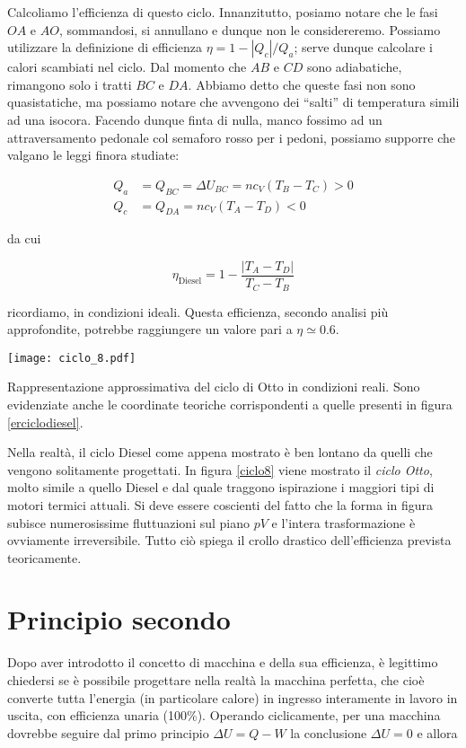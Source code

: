 Calcoliamo l'efficienza di questo ciclo. Innanzitutto, posiamo
notare che le fasi $OA$ e $AO$, sommandosi, si annullano e dunque
non le considereremo. Possiamo utilizzare la definizione di
efficienza $\eta = 1 - |Q_c|/Q_a$; serve dunque calcolare i
calori scambiati nel ciclo. Dal momento che $AB$ e $CD$ sono
adiabatiche, rimangono solo i tratti $BC$ e $DA$. Abbiamo detto
che queste fasi non sono quasistatiche, ma possiamo notare che
avvengono dei ``salti'' di temperatura simili ad una isocora.
Facendo dunque finta di nulla, manco fossimo ad un attraversamento
pedonale col semaforo rosso per i pedoni,
possiamo supporre che valgano le leggi finora studiate:

\begin{align*}
    Q_a &= Q_{BC} = \Delta U_{BC} = nc_V(T_B - T_C) > 0\\
    Q_c &= Q_{DA} = nc_V(T_A - T_D) < 0
\end{align*}

\noindent da cui

\[ \eta_\text{Diesel} = 1 - \frac{|T_A - T_D|}{T_C - T_B} \]

\noindent ricordiamo, in condizioni ideali. Questa efficienza,
secondo analisi più approfondite, potrebbe raggiungere un
valore pari a $\eta \simeq 0.6$.

\begin{marginfigure}
    \centering
    \texttt{[image: ciclo\_8.pdf]}
    \caption{Rappresentazione approssimativa del ciclo di Otto in
    condizioni reali. Sono evidenziate anche le coordinate teoriche
    corrispondenti a quelle presenti in figura \ref{erciclodiesel}.}
    \label{ciclo8}
\end{marginfigure}

Nella realtà, il ciclo Diesel come appena mostrato è ben lontano
da quelli che vengono solitamente progettati. In figura \ref{ciclo8}
viene mostrato il \textit{ciclo Otto}, molto simile a quello Diesel
e dal quale traggono ispirazione i maggiori tipi di motori termici
attuali. Si deve essere coscienti del fatto che la forma in figura
subisce numerosissime fluttuazioni sul piano $pV$ e l'intera trasformazione
è ovviamente irreversibile. Tutto ciò spiega il crollo drastico
dell'efficienza prevista teoricamente.






\section{Principio secondo}
Dopo aver introdotto il concetto di macchina e della sua efficienza,
è legittimo chiedersi se è possibile progettare nella realtà
la macchina perfetta, che cioè converte tutta l'energia
(in particolare calore) in ingresso interamente in lavoro in uscita,
con efficienza unaria (100\%).
Operando ciclicamente, per una macchina dovrebbe seguire dal primo
principio $\Delta U = Q - W$ la conclusione $\Delta U = 0$ e allora

